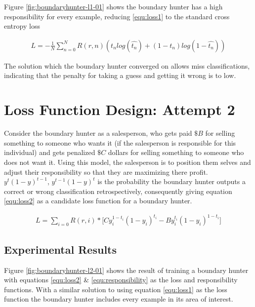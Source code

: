 \documentclass[notitlepage]{report}
\theoremstyle{definition}
\begin{document}
Figure \ref{fig:boundaryhunter-l1-01} shows the boundary hunter has a high responsibility for every example, reducing \ref{equ:loss1} to the standard cross entropy loss

\begin{align*}
L = -\frac{1}{N} \sum_{n=0}^N R(r, n) (t_n log(\widehat{t_n}) + (1-t_n)log(1 - \widehat{t_n}))
\end{align*} 

The solution which the boundary hunter converged on allows miss classifications, indicating that the penalty for taking a guess and getting it wrong is to low.

\section{Loss Function Design: Attempt 2}
Consider the boundary hunter as a salesperson, who gets paid $\$B$ for selling something to someone who wants it (if the salesperson is responsible for this individual) and gets penalized $\$C$ dollars for selling something to someone who does not want it. Using this model, the salesperson is to position them selves and adjust their responsibility so that they are maximizing there profit.\\

$y^t(1-y)^{t-1}$, $y^{t-1}(1-y)^t$ is the probability the boundary hunter outputs a correct or wrong classification retrospectively, consequently giving equation \ref{equ:loss2} as a candidate loss function for a boundary hunter.

\begin{align}
L = \sum_{i=0} R(r, i) * \big[Cy_i^{1-t_i}(1-y_i)^{t_i} - By_i^{t_i}(1-y_i)^{1-t_i} \big]
\label{equ:loss2}
\end{align}

\subsection{Experimental Results}
Figure \ref{fig:boundaryhunter-l2-01} shows the result of training a boundary hunter with equations \ref{equ:loss2} \& \ref{equ:responsibility} as the loss and responsibility functions. With a similar solution to using equation \ref{equ:loss1} as the loss function the boundary hunter includes every example in its area of interest.\\
\end{document}
